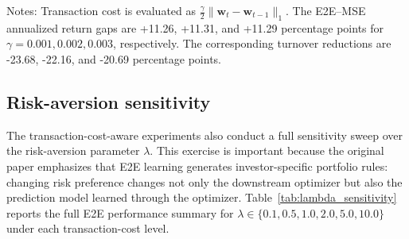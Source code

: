 \documentclass[11pt]{article}
\begin{document}
\begin{table}[H]
\centering
\caption{Transaction-cost sensitivity, $\lambda=1.0$}
\label{tab:gamma_results}
\begin{flushleft}
\small
Notes: Transaction cost is evaluated as $\frac{\gamma}{2}\|\bm w_t-\bm w_{t-1}\|_1$. The E2E--MSE annualized return gaps are +11.26, +11.31, and +11.29 percentage points for $\gamma=0.001,0.002,0.003$, respectively. The corresponding turnover reductions are -23.68, -22.16, and -20.69 percentage points.
\end{flushleft}
\end{table}

\subsection{Risk-aversion sensitivity}

The transaction-cost-aware experiments also conduct a full sensitivity sweep over the risk-aversion parameter $\lambda$. This exercise is important because the original paper emphasizes that E2E learning generates investor-specific portfolio rules: changing risk preference changes not only the downstream optimizer but also the prediction model learned through the optimizer. Table~\ref{tab:lambda_sensitivity} reports the full E2E performance summary for $\lambda\in\{0.1,0.5,1.0,2.0,5.0,10.0\}$ under each transaction-cost level.
\end{document}
